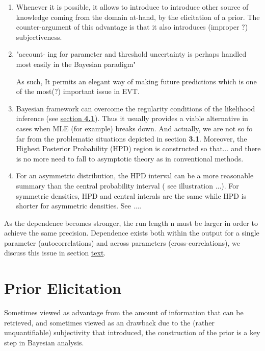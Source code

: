 \documentclass[11pt,a4paper,openany ]{book}
\begin{document}
\begin{enumerate}
	
	\item Whenever it is possible, it allows to introduce to introduce other source of knowledge coming from the domain at-hand, by the elicitation of a prior.  The counter-argument of this advantage is that it also introduces (improper ?) subjectiveness.
	\item\label{it2bayes} "account-
	ing for parameter and threshold uncertainty is perhaps handled most easily in the
	Bayesian paradigm" \cite[pp.106]{dey_extreme_2016}
	
	As such, It permits an elegant way of making future predictions  which is one of the most(?) important issue in EVT.
	
	\item Bayesian framework can overcome the regularity conditions of the likelihood inference
	(see \hyperref[likintro]{section \textbf{4.1}}).
	Thus it usually provides a viable alternative in cases when MLE (for example) breaks down. And actually, we are not so fo far from the problematic situations depicted in section \textbf{3.1}. 
	Moreover, the Highest Posterior Probability (HPD) region is constructed so that... and there is no more need to fall to asymptotic theory as in conventional methods.
	
	
	\item For an asymmetric distribution,
	the HPD interval can be a more reasonable summary than the central probability
	interval ( see illustration ...). For symmetric densities, HPD and central interals are the same while HPD is shorter for asymmetric densities.
	See \citet{liu_simulation-efficient_2015}....
	
\end{enumerate}



As the dependence becomes stronger, the run length n must be larger in order
to achieve the same precision. Dependence exists both within the output for a single parameter
(autocorrelations) and across parameters (cross-correlations), we discuss this issue in section \hyperref[label]{text}.




\section{Prior Elicitation}

Sometimes viewed as advantage from the amount of information that can be retrieved, and sometimes viewed as an drawback due to the (rather unquantifiable) subjectivity that introduced, the construction of the prior is a key step in Bayesian analysis.
\end{document}
